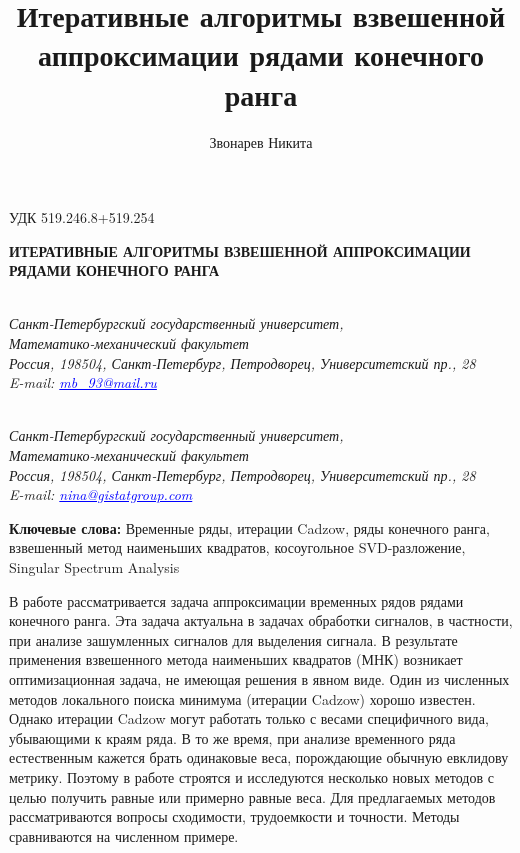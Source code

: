 \documentclass[12pt,a4paper,fleqn,leqno]{article}
\author{Звонарев Никита}
\title{Итеративные алгоритмы взвешенной аппроксимации рядами конечного ранга}
\begin{document}
\noindent УДК 519.246.8+519.254

\begin{center}{
\fontsize{18pt}{23pt}\selectfont\bf%
  \MakeUppercase{
 Итеративные алгоритмы взвешенной аппроксимации рядами конечного ранга
}}
\end{center}

\begin{center}{\bpv{}\\
\footnotesize\it Санкт-Петербургский государственный университет,\\
Математико-механический факультет
\\
\rm
Россия, 198504, Санкт-Петербург, Петродворец, Университетский пр., 28\\
E-mail: \textcolor {blue}{\underline{mb\_93@mail.ru}}}
\end{center}
\begin{center}{\\
\footnotesize\it Санкт-Петербургский государственный университет,\\
Математико-механический факультет
\\
\rm
Россия, 198504, Санкт-Петербург, Петродворец, Университетский пр., 28\\
E-mail: \textcolor {blue}{\underline{nina@gistatgroup.com}}}
\end{center}
\hspace{1.25cm}\begin{minipage}{12.16cm}\bpv\bpv\bmv \noindent
\footnotesize{\bf Ключевые слова:}\/ Временные ряды, итерации Cadzow, ряды конечного ранга, взвешенный метод наименьших квадратов, косоугольное SVD-разложение, Singular Spectrum Analysis

\bpv\bpv\noindent  В работе рассматривается задача аппроксимации временных рядов рядами конечного ранга. Эта задача актуальна в задачах обработки сигналов, в частности, при анализе зашумленных сигналов для выделения сигнала. В результате применения взвешенного метода наименьших квадратов (МНК) возникает оптимизационная задача, не имеющая решения в явном виде. Один из численных методов локального поиска минимума (итерации Cadzow) хорошо известен. Однако  итерации Cadzow могут работать только с весами специфичного вида, убывающими к краям ряда. В то же время, при анализе временного ряда естественным кажется брать одинаковые веса, порождающие обычную евклидову метрику. Поэтому в работе строятся и исследуются несколько новых методов с целью получить равные или примерно равные веса. Для предлагаемых методов рассматриваются вопросы сходимости, трудоемкости и точности. Методы сравниваются на численном примере.

\end{minipage}\bls\bmv
\end{document}
